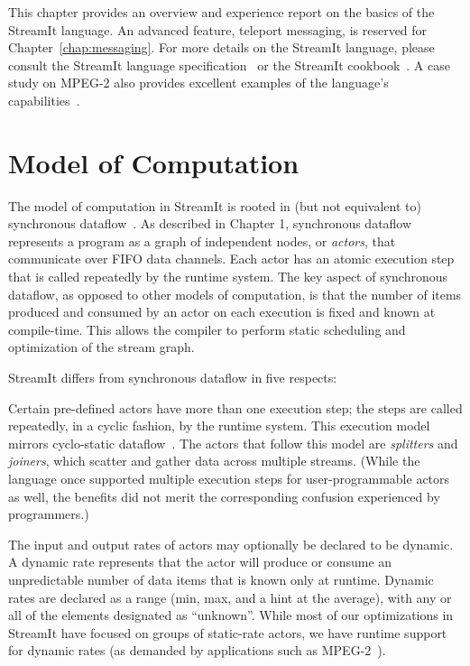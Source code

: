 \label{chap:language}

This chapter provides an overview and experience report on the basics
of the StreamIt language.  An advanced feature, teleport messaging, is
reserved for Chapter~\ref{chap:messaging}.  For more details on
the StreamIt language, please consult the StreamIt language
specification~\cite{streamit-lang-spec} or the StreamIt
cookbook~\cite{streamit-cookbook}.  A case study on MPEG-2 also
provides excellent examples of the language's
capabilities~\cite{drake-ipdps06}.

\section{Model of Computation}

The model of computation in StreamIt is rooted in (but not equivalent
to) synchronous dataflow~\cite{lee_static_1987}.  As described in
Chapter 1, synchronous dataflow represents a program as a graph of
independent nodes, or {\it actors}, that communicate over FIFO data
channels.  Each actor has an atomic execution step that is called
repeatedly by the runtime system.  The key aspect of synchronous
dataflow, as opposed to other models of computation, is that the
number of items produced and consumed by an actor on each execution is
fixed and known at compile-time.  This allows the compiler to perform
static scheduling and optimization of the stream graph.

StreamIt differs from synchronous dataflow in five respects:
\mybegin

  Certain pre-defined actors have
  more than one execution step; the steps are called repeatedly, in a
  cyclic fashion, by the runtime system.  This execution model mirrors
  cyclo-static
  dataflow~\cite{bilsen_cyclo-static_1995,parks_comparison_1995}.  The
  actors that follow this model are {\it splitters} and {\it joiners},
  which scatter and gather data across multiple streams.  (While the
  language once supported multiple execution steps for
  user-programmable actors as well, the benefits did not merit the
  corresponding confusion experienced by programmers.)

  The input and output rates of actors may
  optionally be declared to be dynamic.  A dynamic rate represents
  that the actor will produce or consume an unpredictable number of
  data items that is known only at runtime.  Dynamic rates are
  declared as a range (min, max, and a hint at the average), with any
  or all of the elements designated as ``unknown''.  While most of our
  optimizations in StreamIt have focused on groups of static-rate
  actors, we have runtime support for dynamic rates (as demanded by
  applications such as MPEG-2~\cite{drake-ipdps06}).

